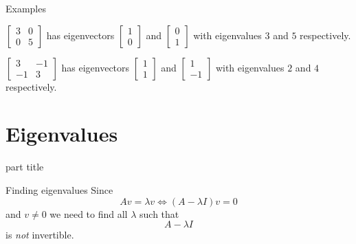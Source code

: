\documentclass{beamer}
\begin{document}
\begin{frame}{Examples}
\begin{example}
$\left[
\begin{matrix}
3&0\\
0&5
\end{matrix}
\right]$ has eigenvectors $\left[
\begin{matrix}
1\\
0
\end{matrix}
\right]$ and $\left[
\begin{matrix}
0\\
1
\end{matrix}
\right]$ with eigenvalues $3$ and $5$ respectively.
\end{example}
\begin{example}
$\left[
\begin{matrix}
3&-1\\
-1&3
\end{matrix}
\right]$ has eigenvectors $\left[
\begin{matrix}
1\\
1
\end{matrix}
\right]$ and $\left[
\begin{matrix}
1\\
-1
\end{matrix}
\right]$ with eigenvalues $2$ and $4$ respectively.
\end{example}
\end{frame}

\section{Eigenvalues}

\begin{frame}
\begin{beamercolorbox}[sep=12pt,center]{part title}
\insertsection\par
\end{beamercolorbox}
\end{frame}

\begin{frame}{Finding eigenvalues}
Since
\begin{equation*}
Av = \lambda v \iff (A-\lambda I)v = 0
\end{equation*}
and $v\neq 0$ we need to find all $\lambda$ such that 
\begin{equation*}
	A-\lambda I
\end{equation*}
is \emph{not} invertible.
\end{frame}
\end{document}
